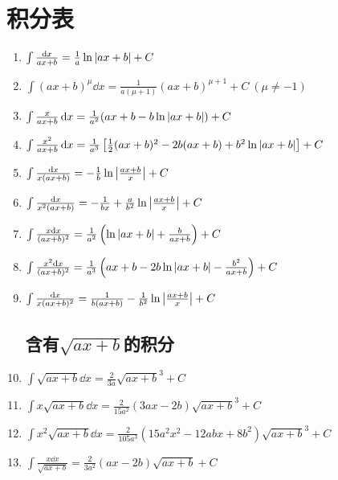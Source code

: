 \chapter{积分表}
\def\mysec#1{\section*{含有\(#1\)的积分}}
\begin{enumerate}
\mysec{ax+b}
\item \(\int \frac{\dd{x}}{ax+b} = \frac{1}{a} \ln\abs{ax+b} + C\)

\item \(\int (ax+b)^{\mu} \dd{x} = \frac{1}{a(\mu+1)} (ax+b)^{\mu+1} + C\ (\mu\neq-1)\)

\item \(\int \frac{x}{ax+b} \dd{x} = \frac{1}{a^2} (ax+b-b\ln\abs{ax+b}) + C\)

\item \(\int \frac{x^2}{ax+b} \dd{x} = \frac{1}{a^3} \left[
	\frac{1}{2} (ax+b)^2 - 2b(ax+b) + b^2 \ln\abs{ax+b}
\right] + C\)

\item \(\int \frac{\dd{x}}{x(ax+b)} = -\frac{1}{b} \ln\abs{\frac{ax+b}{x}} + C\)

\item \(\int \frac{\dd{x}}{x^2(ax+b)} = -\frac{1}{bx} + \frac{a}{b^2} \ln\abs{\frac{ax+b}{x}} + C\)

\item \(\int \frac{x\dd{x}}{(ax+b)^2} = \frac{1}{a^2} \left( \ln\abs{ax+b} + \frac{b}{ax+b} \right) + C\)

\item \(\int \frac{x^2 \dd{x}}{(ax+b)^2} = \frac{1}{a^3} \left( ax+b - 2b \ln\abs{ax+b} - \frac{b^2}{ax+b} \right) + C\)

\item \(\int \frac{\dd{x}}{x(ax+b)^2} = \frac{1}{b(ax+b)} - \frac{1}{b^2} \ln\abs{\frac{ax+b}{x}} + C\)

\mysec{\sqrt{ax+b}}
\item \(\int \sqrt{ax+b} \dd{x} = \frac{2}{3a} \sqrt{ax+b}^3 + C\)

\item \(\int x \sqrt{ax+b} \dd{x} = \frac{2}{15a^2} (3ax-2b) \sqrt{ax+b}^3 + C\)

\item \(\int x^2 \sqrt{ax+b} \dd{x} = \frac{2}{105a^3} (15a^2x^2-12abx+8b^2) \sqrt{ax+b}^3 + C\)

\item \(\int \frac{x \dd{x}}{\sqrt{ax+b}} = \frac{2}{3a^2} (ax-2b) \sqrt{ax+b} + C\)


\end{enumerate}
